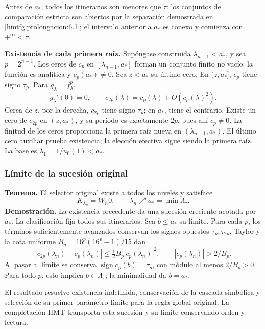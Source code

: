 Antes de \(a_*\), todos los itinerarios son menores que \(\tau\): los conjuntos de comparación estricta son abiertos por la separación demostrada en \ref{hmtfg:prolongacion:6.1}; el intervalo anterior a \(a_*\) es conexo y comienza con \(+^\infty<\tau\).

\textbf{Existencia de cada primera raíz.} Supóngase construida \(\lambda_{n-1}<a_*\), y sea \(p=2^{n-1}\). Los ceros de \(c_p\) en \([\lambda_{n-1},a_*]\) forman un conjunto finito no vacío: la función es analítica y \(c_p(a_*)\ne0\). Sea \(z<a_*\) su último cero. En \((z,a_*]\), \(c_p\) tiene signo \(\tau_p\). Para \(g_\lambda=f_\lambda^p\),
\[
g_\lambda'(0)=0,\qquad
c_{2p}(\lambda)=c_p(\lambda)+O(c_p(\lambda)^2).
\]
Cerca de \(z\), por la derecha, \(c_{2p}\) tiene signo \(\tau_p\); en \(a_*\), tiene el contrario. Existe un cero de \(c_{2p}\) en \((z,a_*)\), y su período es exactamente \(2p\), pues allí \(c_p\ne0\). La finitud de los ceros proporciona la primera raíz nueva en \((\lambda_{n-1},a_*)\). El último cero auxiliar prueba existencia; la elección efectiva sigue siendo la primera raíz. La base es \(\lambda_1=1/u_0(1)<a_*\).

\subsubsection{Límite de la sucesión original}
\label{hmtfg:escalado:15.2}

\textbf{Teorema.} El selector original existe a todos los niveles y satisface
\begin{equation}
\boxed{K_{\lambda_n}=W_n0,\qquad
\lambda_n\nearrow a_*=\min\Lambda_\tau.}
\label{hmtfg:escalado:eq:50}
\end{equation}
\textbf{Demostración.} La existencia precedente da una sucesión creciente acotada por \(a_*\). La clasificación fija todos sus itinerarios. Sea \(b\le a_*\) su límite. Para cada \(p\), los términos suficientemente avanzados conservan los signos opuestos \(\tau_p,\tau_{2p}\). Taylor y la cota uniforme \(B_p=16^p(16^p-1)/15\) dan
\[
|c_{2p}(\lambda_n)-c_p(\lambda_n)|
\le\tfrac12 B_p|c_p(\lambda_n)|^2,\qquad
|c_p(\lambda_n)|>2/B_p.
\]
Al pasar al límite se conserva \(\operatorname{sign}c_p(b)=\tau_p\), con módulo al menos \(2/B_p>0\). Para todo \(p\), esto implica \(b\in\Lambda_\tau\); la minimalidad da \(b=a_*\).

El resultado resuelve existencia indefinida, conservación de la cascada simbólica y selección de su primer parámetro límite para la regla global original. La completación HMT transporta esta sucesión y su límite conservando orden y lectura.

